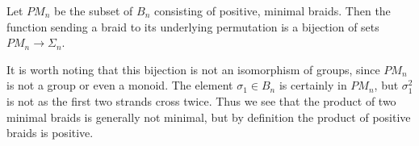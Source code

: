 \begin{lem}\label{pmlem}
Let $PM_{n}$ be the subset of $B_{n}$ consisting of positive, minimal braids. Then the function sending a braid to its underlying permutation is a bijection of sets $PM_{n} \rightarrow \Sigma_{n}$.
\end{lem}

\begin{rem}\label{pmrem}
It is worth noting that this bijection is not an isomorphism of groups, since $PM_{n}$ is not a group or even a monoid. The element $\sigma_{1} \in B_{n}$ is certainly in $PM_{n}$, but $\sigma_{1}^{2}$ is not as the first two strands cross twice. Thus we see that the product of two minimal braids is generally not minimal, but by definition the product of positive braids is positive.
\end{rem}

